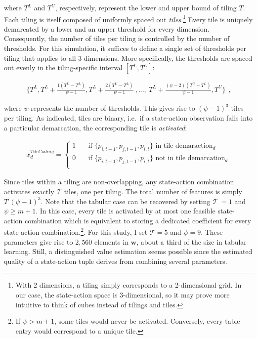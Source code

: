 where $T^L$ and $T^U$, respectively, represent the lower and upper bound of tiling $T$. Each tiling is itself composed of uniformly spaced out \emph{tiles}.\footnote{With 2 dimensions, a tiling simply corresponds to a 2-dimensional grid. In our case, the state-action space is 3-dimensional, so it may prove more intuitive to think of cubes instead of tilings and tiles.} Every tile is uniquely demarcated by a lower and an upper threshold for every dimension. Consequently, the number of tiles per tiling is controlled by the number of thresholds. For this simulation, it suffices to define a single set of thresholds per tiling that applies to all 3 dimensions. More specifically, the thresholds are spaced out evenly in the tiling-specific interval $[T^L, T^U]$:

\begin{gather}
\{
T^L,
T^L + \frac{1(T^U - T^L)}{\psi - 1},
T^L + \frac{2(T^U - T^L)}{\psi - 1}~ , ... , ~
T^L + \frac{(\psi-2)(T^U - T^L)}{\psi - 1},
T^U\} ~~ \text{,}
\end{gather}

where $\psi$ represents the number of thresholds. This gives rise to $(\psi-1)^3$ tiles per tiling. As indicated, tiles are binary, i.e.\ if a state-action observation falls into a particular demarcation, the corresponding tile is \emph{activated}:

\begin{gather}\label{tile_activation}
x_d^{Tile Coding} = \begin{cases}
1 & \quad \text{if } \{p_{i, t-1}, p_{j, t-1}, p_{i, t}\} \text{~in tile demaraction}_d  \\
0 & \quad \text{if } \{p_{i, t-1}, p_{j, t-1}, p_{i, t}\} \text{~not in tile demarcation}_d \\ \end{cases} 
\end{gather}

Since tiles within a tiling are non-overlapping, any state-action combination activates exactly $\mathcal{T}$ tiles, one per tiling. The total number of features is simply $T~(\psi - 1)^3$. Note that the tabular case can be recovered by setting $\mathcal{T}~ = 1$ and $\psi \geq m + 1$. In this case, every tile is activated by at most one feasible state-action combination which is equivalent to storing a dedicated coefficient for every state-action combination.\footnote{If $\psi > m + 1$, some tiles would never be activated. Conversely, every table entry would correspond to a unique tile.}. For this study, I set $\mathcal{T} = 5$ and $\psi = 9$. These parameters give rise to $2,560$ elements in $\boldsymbol{w}$, about a third of the size in tabular learning. Still, a distinguished value estimation seems possible since the estimated quality of a state-action tuple derives from combining several parameters. 



